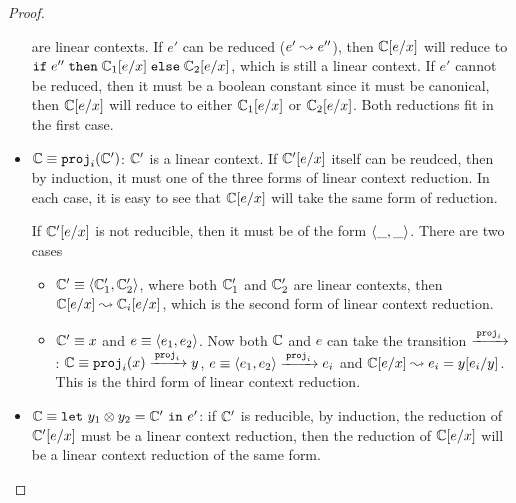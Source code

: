 \documentclass[10pt,a4]{article}
\begin{document}
\begin{proof}
\begin{itemize}
  are linear contexts. If $e'$ can be reduced ($e' \leadsto e''$), then $\mathbb{C}[e/x]$ will reduce to 
  $\mathtt{if} \; {e''} \; \mathtt{then} \; {\mathbb{C}_1[e/x]} \; \mathtt{else} \; {\mathbb{C}_2[e/x]}$, which is still a linear context. If $e'$ cannot be reduced, 
  then it must be a boolean constant since it must be canonical, then $\mathbb{C}[e/x]$ will reduce to 
  either $\mathbb{C}_1[e/x]$ or $\mathbb{C}_2[e/x]$.  Both reductions fit in the first case.
\item $\mathbb{C} \equiv \mathtt{proj}_i (\mathbb{C}')$: $\mathbb{C}'$ is a linear context. If $\mathbb{C}'[e/x]$ itself 
  can be reudced, then by induction, it must one of the three forms of linear context reduction. 
  In each case, it is easy to see that $\mathbb{C}[e/x]$ will take the same form of reduction. 
  
  If $\mathbb{C}'[e/x]$ is not reducible, then it must be of the form $\langle{\_, \_}\rangle$. There are two cases 
  \begin{itemize}
  \item $\mathbb{C}' \equiv \langle{\mathbb{C}_1', \mathbb{C}_2'}\rangle$, where both $\mathbb{C}_1'$ and $\mathbb{C}_2'$ 
    are linear contexts, then $\mathbb{C}[e/x] \leadsto \mathbb{C}_i[e/x]$, which is the second form of 
    linear context reduction.
  \item $\mathbb{C}' \equiv x$ and $e \equiv \langle{e_1, e_2}\rangle$. Now both $\mathbb{C}$ and $e$ can take 
    the transition $\xrightarrow{\,{\mathtt{proj}_i}\,}$: $\mathbb{C} \equiv \mathtt{proj}_i(x) \xrightarrow{\,{\mathtt{proj}_i}\,} y$,
    $e \equiv \langle{e_1, e_2}\rangle \xrightarrow{\,{\mathtt{proj}_i}\,} e_i$ and $\mathbb{C}[e/x] \leadsto e_i = y[e_i/y]$. 
    This is the third form of linear context reduction.
  \end{itemize}
\item $\mathbb{C} \equiv \mathtt{let} \ {y_1 \otimes y_2} = {\mathbb{C}'} \ \mathtt{in} \ {e'}$: 
  if $\mathbb{C}'$ is reducible, by induction, the reduction of $\mathbb{C}'[e/x]$ must be a linear 
  context reduction, then the reduction of $\mathbb{C}[e/x]$ will be a linear context reduction of 
  the same form.
  

\end{itemize}
\end{proof}
\end{document}
